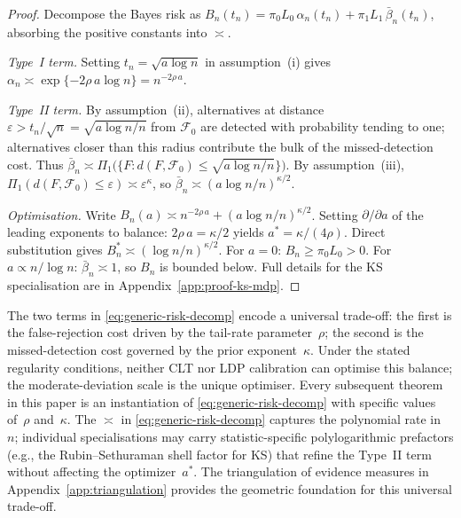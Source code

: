 \documentclass[11pt]{article}
\newcommand{\calF}{\mathcal{F}}
\newcommand{\rhotail}{\rho}  %
\newcommand{\1}{\mathbf{1}}
\theoremstyle{plain}
\theoremstyle{definition}
\theoremstyle{remark}
\begin{document}
\begin{proof}
Decompose the Bayes risk as $B_n(t_n) = \pi_0 L_0\,\alpha_n(t_n) + \pi_1 L_1\,\bar\beta_n(t_n)$, absorbing the positive constants into $\asymp$.

\emph{Type~I term.}
Setting $t_n = \sqrt{a\log n}$ in assumption~(i) gives $\alpha_n \asymp \exp\{-2\rhotail\, a\log n\} = n^{-2\rhotail\,a}$.

\emph{Type~II term.}
By assumption~(ii), alternatives at distance $\varepsilon > t_n/\sqrt{n} = \sqrt{a\log n/n}$ from $\calF_0$ are detected with probability tending to one; alternatives closer than this radius contribute the bulk of the missed-detection cost.
Thus $\bar\beta_n \asymp \Pi_1\!\bigl(\{F: d(F,\calF_0) \le \sqrt{a\log n/n}\}\bigr)$.
By assumption~(iii), $\Pi_1(d(F,\calF_0)\le\varepsilon)\asymp \varepsilon^{\kappa}$, so $\bar\beta_n \asymp (a\log n/n)^{\kappa/2}$.

\emph{Optimisation.}
Write $B_n(a) \asymp n^{-2\rhotail\,a} + (a\log n/n)^{\kappa/2}$.
Setting $\partial/\partial a$ of the leading exponents to balance: $2\rhotail\,a = \kappa/2$ yields $a^{*}=\kappa/(4\rhotail)$.
Direct substitution gives $B_n^{*} \asymp (\log n/n)^{\kappa/2}$.
For $a=0$: $B_n \ge \pi_0 L_0 > 0$.
For $a \propto n/\log n$: $\bar\beta_n \asymp 1$, so $B_n$ is bounded below.
Full details for the KS specialisation are in Appendix~\ref{app:proof-ks-mdp}.
\end{proof}

The two terms in \eqref{eq:generic-risk-decomp} encode a universal trade-off: the first is the false-rejection cost driven by the tail-rate parameter~$\rhotail$; the second is the missed-detection cost governed by the prior exponent~$\kappa$.
Under the stated regularity conditions, neither CLT nor LDP calibration can optimise this balance; the moderate-deviation scale is the unique optimiser.
Every subsequent theorem in this paper is an instantiation of \eqref{eq:generic-risk-decomp} with specific values of~$\rhotail$ and~$\kappa$.
The $\asymp$ in \eqref{eq:generic-risk-decomp} captures the polynomial rate in~$n$; individual specialisations may carry statistic-specific polylogarithmic prefactors (e.g., the Rubin--Sethuraman shell factor for KS) that refine the Type~II term without affecting the optimizer~$a^*$.
The triangulation of evidence measures in Appendix~\ref{app:triangulation} provides the geometric foundation for this universal trade-off.
\end{document}
